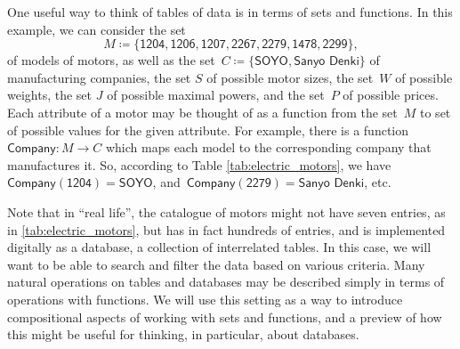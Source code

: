 \begin{comment}
\begin{table}[h]
    \centering
    \begin{tabular}{c|c|c|c|c|c}
         Motor ID & Company& Size & \unit[Weight]{[g]} & \unit[Max Power]{[W]} & \unit[price]{[USD]} \\
         \hline
         $\textsf{Model1}$&Company $\textsf{B}$ & 2 x 3 x 4& 10 & &259\\
         $\textsf{Model2}$&Company $\textsf{A}$ &2 x 3 x 4& 20 & &109\\
         $\textsf{Model3}$&Company $\textsf{B}$ &2 x 3 x 4& 5 & &124\\
         $\textsf{Model4}$&Company $\textsf{C}$ &2 x 3 x 4& 30 & &399\\
         $\textsf{Model5}$&Company $\textsf{A}$ &2 x 3 x 4& 45 & &245  \\
        $\textsf{Model6}$&Company $\textsf{D}$ & 2 x 3 x 4& 20 & &89\\
        $\textsf{Model7}$&Company $\textsf{B}$ & 2 x 3 x 4& 15 &&130
    \end{tabular}
    \caption{A simplified catalogue of motors.}
    \label{tab:electric_motors}
\end{table}
\end{comment}
One useful way to think of tables of data is in terms of sets and functions. In this example, we can consider the set
\begin{equation*}
M \coloneqq \{ \textsf{1204}, \textsf{1206}, \textsf{1207}, \textsf{2267}, \textsf{2279}, \textsf{1478}, \textsf{2299} \},
\end{equation*}
of models of motors, as well as the set~$C \coloneqq \{ \textsf{SOYO}, \textsf{Sanyo Denki}\}$ of manufacturing companies, the set $S$ of possible motor sizes, the set~$W$ of possible weights, the set $J$ of possible maximal powers, and the set~$P$ of possible prices. Each attribute of a motor may be thought of as a function from the set~$M$ to set of possible values for the given attribute. For example, there is a function~$\textsf{Company}\colon M \to C$ which maps each model to the corresponding company that manufactures it. So, according to Table \ref{tab:electric_motors}, we have ~$\textsf{Company}(\textsf{1204}) = \textsf{SOYO}$, and~$\textsf{Company}(\textsf{2279}) = \textsf{Sanyo Denki}$, etc.

Note that in ``real life'', the catalogue of motors might not have seven entries, as in \cref{tab:electric_motors}, but has in fact hundreds of entries, and is implemented digitally as a database,  a collection of interrelated tables. In this case, we will want to be able to search and filter the data based on various criteria. Many natural operations on tables and databases may be described simply in terms of operations with functions. We will use this setting as a way to introduce compositional aspects of working with sets and functions, and a preview of how this might be useful for thinking, in particular, about databases.

